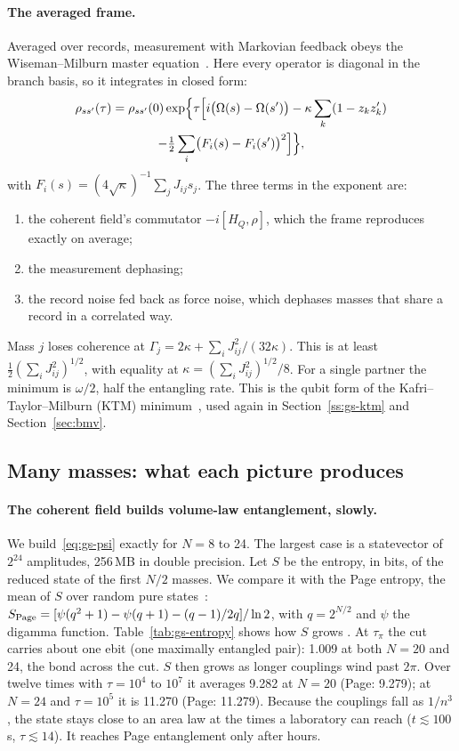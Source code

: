 \paragraph{The averaged frame.} Averaged over records, measurement with Markovian feedback obeys the Wiseman--Milburn master
equation~\cite{wiseman1993}. Here every operator is diagonal in the branch basis, so it integrates in closed form:
\begin{multline}\label{eq:gs-me}
\rho_{ss'}(\tau)=\rho_{ss'}(0)\exp\Bigl\{\tau\Bigl[i\bigl(\Omega(s)-\Omega(s')\bigr)-\kappa\sum_k(1-z_kz'_k)\\
-\tfrac12\sum_i\bigl(F_i(s)-F_i(s')\bigr)^2\Bigr]\Bigr\},
\end{multline}
with $F_i(s)=(4\sqrt\kappa)^{-1}\sum_jJ_{ij}s_j$. The three terms in the exponent are:
\begin{enumerate}[nosep]
\item the coherent field's commutator $-i[H_Q,\rho]$, which the frame reproduces exactly on average;
\item the measurement dephasing;
\item the record noise fed back as force noise, which dephases masses that share a record in a correlated way.
\end{enumerate}
Mass $j$ loses coherence at $\Gamma_j=2\kappa+\sum_iJ_{ij}^2/(32\kappa)$. This is at least $\frac12(\sum_iJ_{ij}^2)^{1/2}$, with equality at
$\kappa=(\sum_iJ_{ij}^2)^{1/2}/8$. For a single partner the minimum is $\omega/2$, half the entangling rate. This is the qubit form of the
Kafri--Taylor--Milburn (KTM) minimum~\cite{ktm}, used again in Section~\ref{ss:gs-ktm} and Section~\ref{sec:bmv}.

\subsection{Many masses: what each picture produces}\label{ss:gs-many}

\paragraph{The coherent field builds volume-law entanglement, slowly.} We build~\eqref{eq:gs-psi} exactly for $N=8$ to 24. The largest case is
a statevector of $2^{24}$ amplitudes, 256\,MB in double precision. Let $S$ be the entropy, in bits, of the reduced state of the first $N/2$
masses. We compare it with the Page entropy, the mean of $S$ over random pure states~\cite{page1993}:
$S_{\rm Page}=[\psi(q^2+1)-\psi(q+1)-(q-1)/2q]/\ln2$, with $q=2^{N/2}$ and $\psi$ the digamma function. Table~\ref{tab:gs-entropy} shows how
$S$ grows .
At $\tau_\pi$ the cut carries about one ebit (one maximally entangled pair): 1.009 at both $N=20$ and 24, the bond across the cut. $S$ then
grows as longer couplings wind past $2\pi$. Over twelve times with $\tau=10^4$ to $10^7$ it averages 9.282 at $N=20$ (Page: 9.279); at
$N=24$ and $\tau=10^5$ it is 11.270 (Page: 11.279). Because the couplings fall as $1/n^3$, the state stays close to an area law at the times a laboratory can reach ($t\lesssim100$\,s,
$\tau\lesssim14$). It reaches Page entanglement only after hours.

